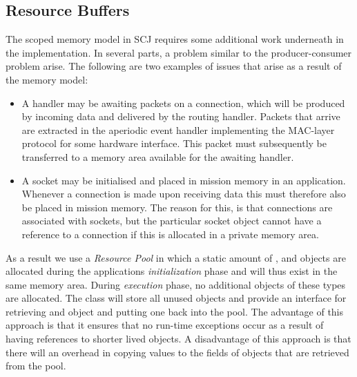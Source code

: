 \subsection{Resource Buffers}
The scoped memory model in SCJ requires some additional work underneath in the implementation. In several parts, a problem similar to the producer-consumer problem arise. The following are two examples of issues that arise as a result of the memory model:
\begin{itemize}
	\item A handler may be awaiting packets on a connection, which will be produced by incoming data and delivered by the routing handler. Packets that arrive are extracted in the aperiodic event handler implementing the MAC-layer protocol for some hardware interface. This packet must subsequently be transferred to a memory area available for the awaiting handler.
	\item A socket may be initialised and placed in mission memory in an application. Whenever a connection is made upon receiving data this must therefore also be placed in mission memory. The reason for this, is that connections are associated with sockets, but the particular socket object cannot have a reference to a connection if this is allocated in a private memory area.
\end{itemize}

As a result we use a \textit{Resource Pool}\cite{Rios:2012:PSJ:2388936.2388938} in which a static amount of ,  and  objects are allocated during the applications \textit{initialization} phase and will thus exist in the same memory area. During \textit{execution} phase, no additional objects of these types are allocated. The class  will store all unused objects and provide an interface for retrieving and object and putting one back into the pool. The advantage of this approach is that it ensures that no run-time exceptions occur as a result of having references to shorter lived objects. A disadvantage of this approach is that there will an overhead in copying values to the fields of objects that are retrieved from the pool. 